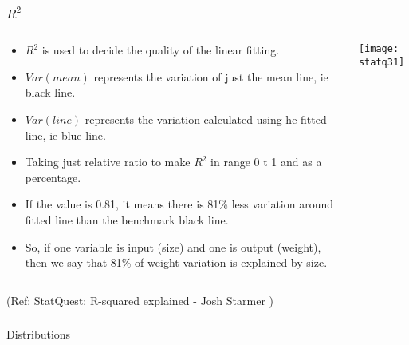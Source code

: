 \begin{frame}[fragile]\frametitle{$R^2$}

\begin{columns}
    \begin{column}[T]{0.6\linewidth}
	\begin{itemize}
	\item $R^2$ is used to decide the quality of the linear fitting.
	\item $Var(mean)$ represents the variation of just the mean line, ie black line.
	\item $Var(line)$ represents the variation calculated using he fitted line, ie blue line.
	\item Taking just relative ratio to make $R^2$ in range 0 t 1 and as a percentage.
	\item If the value is 0.81, it means there is 81\% less variation around fitted line than the benchmark black line.
	\item So, if one variable is input (size) and one is output (weight), then we say that 81\% of weight variation is explained by size.
	\end{itemize}

    \end{column}
    \begin{column}[T]{0.4\linewidth}
      \begin{center}
      \texttt{[image: statq31]}
	  
	   
	  	\end{center}
    \end{column}

  \end{columns}
  
	
\tiny{(Ref: StatQuest: R-squared explained - Josh Starmer )}
\end{frame}



\begin{frame}[fragile]\frametitle{}
\begin{center}
{\Large Distributions}
\end{center}
\end{frame}


